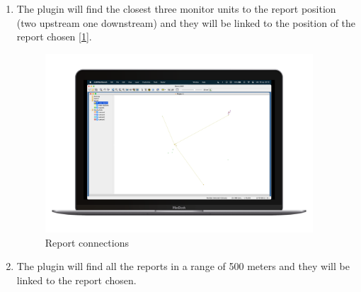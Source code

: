 \begin{enumerate}
    \item The plugin will find the closest three monitor units to the report position (two upstream one downstream) and they will be linked to the position of the report chosen [\ref{optuTorial3}].
    \begin{figure}[H]
        \centering
        \includegraphics[width=27em]{img/op3.png} \caption{Report connections} \label{optuTorial3}
    \end{figure}

    \item The plugin will find all the reports in a range of 500 meters and they will be linked to the report chosen.
\end{enumerate}

